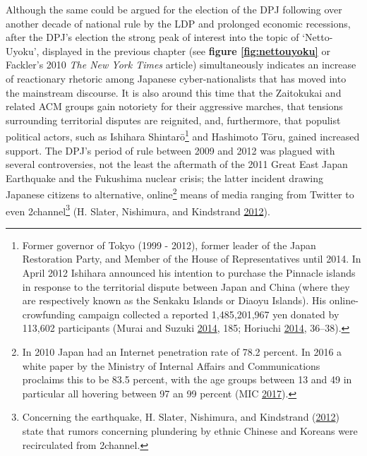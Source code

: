\documentclass[10pt,british,A4paper,oneside]{memoir}
\begin{document}
Although the same could be argued for the election of the DPJ following over
another decade of national rule by the LDP and prolonged economic
recessions, after the DPJ's election the strong peak of interest into
the topic of `Netto-Uyoku', displayed in the previous chapter (see
\textbf{figure \ref{fig:nettouyoku}} or Fackler's 2010 \emph{The New
York Times} article) simultaneously indicates an increase of reactionary
rhetoric among Japanese cyber-nationalists that has moved into the
mainstream discourse. It is also around this time that the Zaitokukai
and related ACM groups gain notoriety for their aggressive marches, that
tensions surrounding territorial disputes are reignited, and,
furthermore, that populist political actors, such as Ishihara
Shintarō\footnote{Former governor of Tokyo (1999 - 2012), former leader
  of the Japan Restoration Party, and Member of the House of
  Representatives until 2014. In April 2012 Ishihara announced his
  intention to purchase the Pinnacle islands in response to the
  territorial dispute between Japan and China (where they are
  respectively known as the Senkaku Islands or Diaoyu Islands). His
  online-crowfunding campaign collected a reported 1,485,201,967 yen
  donated by 113,602 participants (Murai and Suzuki
  \protect\hyperlink{ref-hollihan_how_2014}{2014}, 185; Horiuchi
  \protect\hyperlink{ref-horiuchi_public_2014}{2014}, 36--38).} and
Hashimoto Tōru, gained increased support. The DPJ's period of rule
between 2009 and 2012 was plagued with several controversies, not the
least the aftermath of the 2011 Great East Japan Earthquake and the
Fukushima nuclear crisis; the latter incident drawing Japanese citizens
to alternative, online\footnote{In 2010 Japan had an Internet penetration rate
of 78.2 percent. In 2016 a white paper by the Ministry of
  Internal Affairs and Communications proclaims this to be 83.5 percent,
  with the age groups between 13 and 49 in particular all hovering
  between 97 an 99 percent (MIC
  \protect\hyperlink{ref-mic_communications_2017}{2017}).} means of
media ranging from Twitter to even 2channel\footnote{Concerning the
  earthquake, H. Slater, Nishimura, and Kindstrand
  (\protect\hyperlink{ref-h._slater_social_2012}{2012}) state that
  rumors concerning plundering by ethnic Chinese and Koreans were
  recirculated from 2channel.} (H. Slater, Nishimura, and Kindstrand
\protect\hyperlink{ref-h._slater_social_2012}{2012}).
\end{document}
